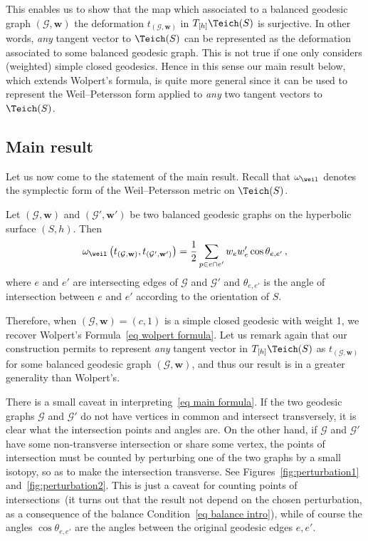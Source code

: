 This enables us to show that the map which associated to a balanced geodesic graph $(\mathcal G,\mathbf w)$ the deformation $t_{(\mathcal G,\mathbf w)}$ in $T_{[h]}\Teich(S)$ is surjective. In other words, \emph{any} tangent vector to $\Teich(S)$ can be represented as the deformation associated to some balanced geodesic graph. This is not true if one only considers (weighted) simple closed geodesics. Hence in this sense our main result below, which extends Wolpert's formula, is quite more general since it can be used to represent the Weil--Petersson form applied to \emph{any} two tangent vectors to $\Teich(S)$.

\subsection{Main result}

Let us now come to the statement of the main result. Recall that $\omega_\weil$ denotes the symplectic form of the Weil--Petersson metric on $\Teich(S)$.

\begin{theo*}
Let $(\mathcal G,\mathbf w)$ and $(\mathcal G',\mathbf w')$ be two balanced geodesic graphs on the hyperbolic surface $(S,h)$. Then
\begin{equation}\label{eq main formula}
\omega_\weil\left(t_{(\mathcal G,\mathbf w)},t_{(\mathcal G',\mathbf w')}\right)=\frac{1}{2}\sum_{p\in e\cap e'}w_ew_e'\cos \theta_{e,e'}\,,
\end{equation}
where $e$ and $e'$ are intersecting edges of $\mathcal G$ and $\mathcal G'$ and $\theta_{e,e'}$ is the angle of intersection between $e$ and $e'$ according to the orientation of $S$.
\end{theo*}

Therefore, when $(\mathcal G,\mathbf w)=(c,1)$ is a simple closed geodesic with weight 1, we recover Wolpert's Formula~\eqref{eq wolpert formula}. Let us remark again that our construction permits to represent \emph{any} tangent vector in $T_{[h]}\Teich(S)$ as $t_{(\mathcal G,\mathbf w)}$ for some balanced geodesic graph $(\mathcal G,\mathbf w)$, and thus our result is in a greater generality than Wolpert's.

There is a small caveat in interpreting~\eqref{eq main formula}. If the two geodesic graphs $\mathcal G$ and $\mathcal G'$ do not have vertices in common and intersect transversely, it is clear what the intersection points and angles are. On the other hand, if $\mathcal G$ and $\mathcal G'$ have some non-transverse intersection or share some vertex, the points of intersection must be counted by perturbing one of the two graphs by a small isotopy, so as to make the intersection transverse. See Figures~\ref{fig:perturbation1} and~\ref{fig:perturbation2}. This is just a caveat for counting points of intersections~(it turns out that the result not depend on the chosen perturbation, as a consequence of the balance Condition~\eqref{eq balance intro}), while of course the angles $\cos\theta_{e,e'}$ are the angles between the original geodesic edges $e,e'$.


